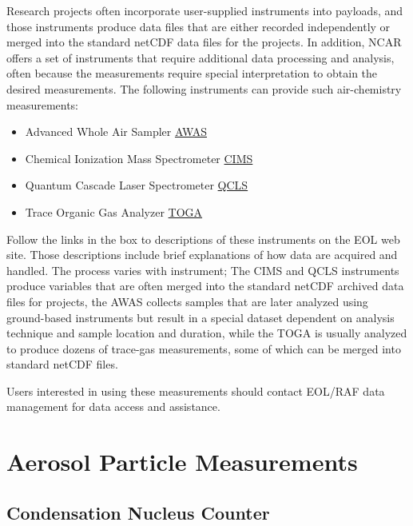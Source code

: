 \documentclass[
  english,
]{book}
\begin{document}
Research projects often incorporate user-supplied instruments into
payloads, and those instruments produce data files that are either
recorded independently or merged into the standard netCDF data files for
the projects. In addition, NCAR offers a set of instruments that require
additional data processing and analysis, often because the measurements
require special interpretation to obtain the desired measurements. The
following instruments can provide such air-chemistry measurements:

\begin{itemize}
\item
  \setlength{\itemsep}{-1\parsep}Advanced Whole Air Sampler
  \href{http://www.eol.ucar.edu/instruments/advanced-whole-air-sampler}{AWAS}
\item
  Chemical Ionization Mass Spectrometer
  \href{http://www.eol.ucar.edu/instruments/georgia-tech-chemical-ionization-mass-spectrometer}{CIMS}
\item
  Quantum Cascade Laser Spectrometer
  \href{http://www.eol.ucar.edu/instruments/quantum-cascade-laser-spectrometer}{QCLS}
\item
  Trace Organic Gas Analyzer
  \href{http://www.eol.ucar.edu/instruments/trace-organic-gas-analyzer}{TOGA}
\end{itemize}

Follow the links in the box to descriptions of these instruments on the
EOL web site. Those descriptions include brief explanations of how data
are acquired and handled. The process varies with instrument; The CIMS
and QCLS instruments produce variables that are often merged into the
standard netCDF archived data files for projects, the AWAS collects
samples that are later analyzed using ground-based instruments but
result in a special dataset dependent on analysis technique and sample
location and duration, while the TOGA is usually analyzed to produce
dozens of trace-gas measurements, some of which can be merged into
standard netCDF files.

Users interested in using these measurements should contact EOL/RAF data
management for data access and assistance.

\hypertarget{aerosol-particle-measurements}{%
\chapter{Aerosol Particle
Measurements}\label{aerosol-particle-measurements}}

\hypertarget{condensation-nucleus-counter}{%
\section{Condensation Nucleus
Counter}\label{condensation-nucleus-counter}}
\end{document}
